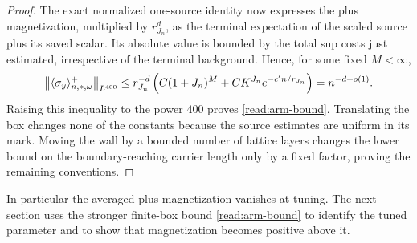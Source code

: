 \begin{proof}
The exact normalized one-source identity now expresses the plus
magnetization, multiplied by $r_{J_n}^d$, as the terminal expectation
of the scaled source plus its saved scalar.  Its absolute value is
bounded by the total sup costs just estimated, irrespective of the
terminal background.  Hence, for some fixed $M<\infty$,
\[
 \left\lVert\langle\sigma_y\rangle^+_{n,*,\omega}\right\rVert_{L^{400}}
 \le r_{J_n}^{-d}\left(C(1+J_n)^M
                  +C K^{J_n}e^{-c'n/r_{J_n}}\right)
       =n^{-d+o(1)}.
\]
Raising this inequality to the power $400$ proves
\eqref{read:arm-bound}.  Translating the box changes none of the
constants because the source estimates are uniform in its mark.
Moving the wall by a bounded number of lattice layers changes the
lower bound on the boundary-reaching carrier length only by a fixed
factor, proving the remaining conventions.
\end{proof}

In particular the averaged plus magnetization vanishes at tuning.
The next section uses the stronger finite-box bound
\eqref{read:arm-bound} to identify the tuned parameter and to show
that magnetization becomes positive above it.
